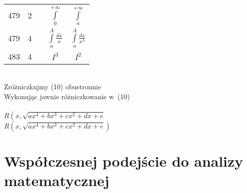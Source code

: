 \documentclass[a4paper,11pt]{article}
\begin{document}
\begin{center}
\begin{tabular}{|c|c|c|c|c|}
           479 & 2 & & $\int\limits_{ 0 }^{ +\infty }$
           & $\int\limits_{ a }^{ +\infty }$ \\[0.8em]
           479 & 4 & & $\int\limits_{ a }^{ A } \frac{ dx }{ x }$
           & $\int\limits_{ a }^{ A } \frac{ dx }{ x^{ \lambda } }$ \\[0.5em]
           483 & 4 & & $I^{ 3 }$ & $I^{ 2 }$ \\
    \hline
  \end{tabular}

\end{center}

\vspace{\spaceTwo}


 \\
\Jest  Zróżniczkujmy (10) obustronnie \\
\Powin Wykonując jawnie różniczkowanie w~(10) \\
 \\
\Jest  $R\left( x, \sqrt{ a x^{ 4 } + b x^{ 3 } + c x^{ 2 } + d x + e }
\right.$ \\
\Powin $R\left( x, \sqrt{ a x^{ 4 } + b x^{ 3 } + c x^{ 2 } + d x + e }
\right)$ \\












\section{Współczesnej podejście do analizy matematycznej}

\vspace{\spaceTwo}



\end{document}
